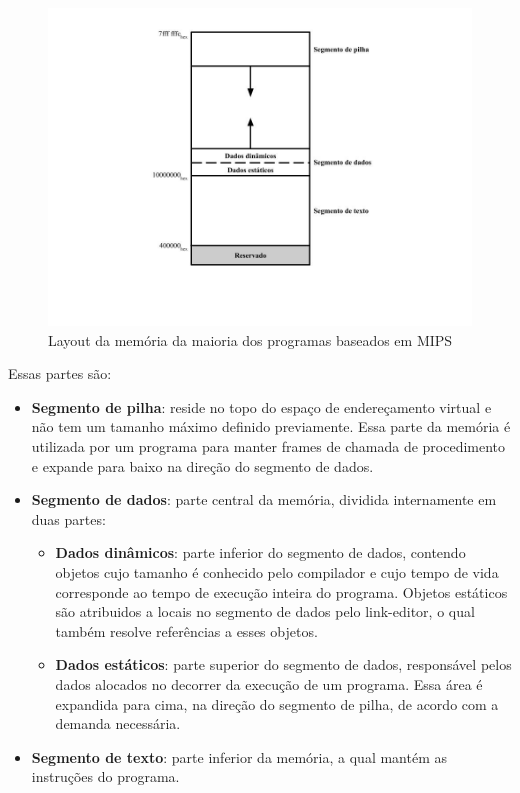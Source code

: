 \documentclass[
	12pt,				%
	oneside,			%
	a4paper,			%
	english,			%
	brazil				%
	]{abntex2ppgsi}
\begin{document}
\begin{figure}[h]
    \centering
    \includegraphics[width=17cm]{memoriaMIPS.jpg}
    \caption{Layout da memória da maioria dos programas baseados em MIPS}
    \label{fig:enter-label}
\end{figure}

Essas partes são:

\begin{itemize}
    \item \textbf{Segmento de pilha}: reside no topo do espaço de endereçamento virtual e não tem um tamanho máximo definido previamente. Essa parte da memória é utilizada por um programa para manter frames de chamada de procedimento e expande para baixo na direção do segmento de dados.
    \item \textbf{Segmento de dados}: parte central da memória, dividida internamente em duas partes:
        \begin{itemize}
            \item \textbf{Dados dinâmicos}: parte inferior do segmento de dados, contendo objetos cujo tamanho é conhecido pelo compilador e cujo tempo de vida corresponde ao tempo de execução inteira do programa. Objetos estáticos são atribuidos a locais no segmento de dados pelo link-editor, o qual também resolve referências a esses objetos.
            \item \textbf{Dados estáticos}: parte superior do segmento de dados, responsável pelos dados alocados no decorrer da execução de um programa. Essa área é expandida para cima, na direção do segmento de pilha, de acordo com a demanda necessária. 
        \end{itemize}
    \item \textbf{Segmento de texto}: parte inferior da memória, a qual mantém as instruções do programa.
\end{itemize}
\end{document}

